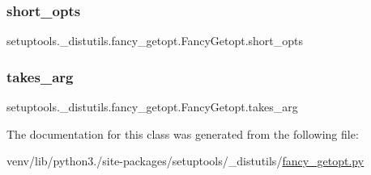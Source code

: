 \subsubsection{\texorpdfstring{short\+\_\+opts}{short\_opts}}
{\footnotesize\ttfamily setuptools.\+\_\+distutils.\+fancy\+\_\+getopt.\+Fancy\+Getopt.\+short\+\_\+opts}

\mbox{\label{classsetuptools_1_1__distutils_1_1fancy__getopt_1_1FancyGetopt_af2c1efe8420df17095501b2f594145d7}} 
\subsubsection{\texorpdfstring{takes\+\_\+arg}{takes\_arg}}
{\footnotesize\ttfamily setuptools.\+\_\+distutils.\+fancy\+\_\+getopt.\+Fancy\+Getopt.\+takes\+\_\+arg}



The documentation for this class was generated from the following file\+:\begin{DoxyCompactItemize}
\item 
venv/lib/python3./site-\/packages/setuptools/\+\_\+distutils/\hyperlink{fancy__getopt_8py}{fancy\+\_\+getopt.\+py}\end{DoxyCompactItemize}
